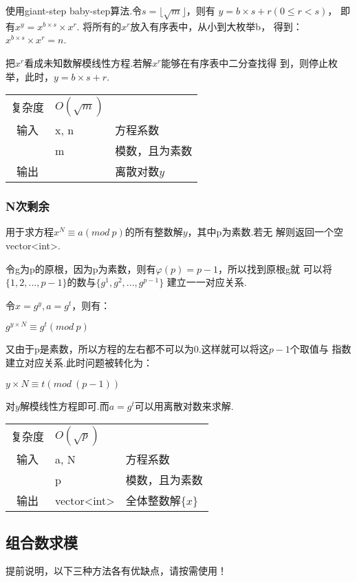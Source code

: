 使用giant-step baby-step算法.令$s = \lfloor \sqrt{m} \rfloor$，则有
$y = b \times s + r(0 \leq r < s)$，
即有$x^{y} = x^{b \times s} \times x^{r}$.
将所有的$x^{r}$放入有序表中，从小到大枚举b，
得到：$x^{b \times s} \times x^{r} = n$.

把$x^{r}$看成未知数解模线性方程.若解$x^{r}$能够在有序表中二分查找得
到，则停止枚举，此时，$y = b \times s + r$.
\begin{longtable}{|c|l|l|}
复杂度 & $O(\sqrt{m})$ &  \\
输入 & x, n & 方程系数 \\
 & m & 模数，且为素数 \\
输出 &  & 离散对数$y$ \\
\end{longtable}



        \subsubsection{N次剩余}\small
用于求方程$x^{N} \equiv a(mod\ p)$的所有整数解$y$，其中p为素数.若无
解则返回一个空vector<int>.

令g为p的原根，因为p为素数，则有$\varphi(p) = p - 1$，所以找到原根g就
可以将$\{1, 2, ..., p - 1\}$的数与$\{g^{1}, g^{2}, ..., g^{p - 1}\}$
建立一一对应关系.

令$x = g^{y}, a = g^{t}$，则有：

$g^{y \times N} \equiv g^{t} (mod\ p)$

又由于p是素数，所以方程的左右都不可以为0.这样就可以将这$p-1$个取值与
指数建立对应关系.此时问题被转化为：

$y \times N \equiv t (mod\ (p-1))$

对$y$解模线性方程即可.而$a = g^{t}$可以用离散对数来求解.

\begin{longtable}{|c|l|l|}
复杂度 & $O(\sqrt{p})$ &  \\
输入 & a, N & 方程系数 \\
 & p & 模数，且为素数 \\
输出 & vector<int> & 全体整数解$\{x\}$ \\
\end{longtable}



    \subsection{组合数求模}\small
提前说明，以下三种方法各有优缺点，请按需使用！


